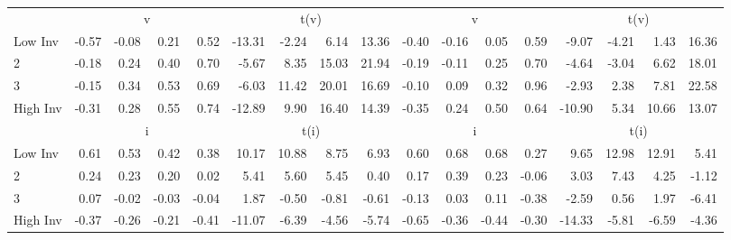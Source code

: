 \begin{table}[!ht]
\begin{tabular}{lrrrrrrrrrrrrrrrr}
     & \multicolumn{4}{c}{v} & \multicolumn{4}{c}{t(v)}  & \multicolumn{4}{c}{v} & \multicolumn{4}{c}{t(v)}   \\
     \cmidrule(r){2-5} \cmidrule(r){6-9}  \cmidrule(r){10-13} \cmidrule(r){14-17} 
    Low Inv  & -0.57  & -0.08  & 0.21  & 0.52  & -13.31  & -2.24  & 6.14  & 13.36  & -0.40  & -0.16  & 0.05  & 0.59  & -9.07  & -4.21  & 1.43  & 16.36   \\
    2  & -0.18  & 0.24  & 0.40  & 0.70  & -5.67  & 8.35  & 15.03  & 21.94  & -0.19  & -0.11  & 0.25  & 0.70  & -4.64  & -3.04  & 6.62  & 18.01   \\
    3  & -0.15  & 0.34  & 0.53  & 0.69  & -6.03  & 11.42  & 20.01  & 16.69  & -0.10  & 0.09  & 0.32  & 0.96  & -2.93  & 2.38  & 7.81  & 22.58   \\
    High Inv  & -0.31  & 0.28  & 0.55  & 0.74  & -12.89  & 9.90  & 16.40  & 14.39  & -0.35  & 0.24  & 0.50  & 0.64  & -10.90  & 5.34  & 10.66  & 13.07   \\


     & \multicolumn{4}{c}{i} & \multicolumn{4}{c}{t(i)}  & \multicolumn{4}{c}{i} & \multicolumn{4}{c}{t(i)}   \\
     \cmidrule(r){2-5} \cmidrule(r){6-9}  \cmidrule(r){10-13} \cmidrule(r){14-17} 
    Low Inv  & 0.61  & 0.53  & 0.42  & 0.38  & 10.17  & 10.88  & 8.75  & 6.93  & 0.60  & 0.68  & 0.68  & 0.27  & 9.65  & 12.98  & 12.91  & 5.41   \\
    2  & 0.24  & 0.23  & 0.20  & 0.02  & 5.41  & 5.60  & 5.45  & 0.40  & 0.17  & 0.39  & 0.23  & -0.06  & 3.03  & 7.43  & 4.25  & -1.12   \\
    3  & 0.07  & -0.02  & -0.03  & -0.04  & 1.87  & -0.50  & -0.81  & -0.61  & -0.13  & 0.03  & 0.11  & -0.38  & -2.59  & 0.56  & 1.97  & -6.41   \\
    High Inv  & -0.37  & -0.26  & -0.21  & -0.41  & -11.07  & -6.39  & -4.56  & -5.74  & -0.65  & -0.36  & -0.44  & -0.30  & -14.33  & -5.81  & -6.59  & -4.36   \\



  \bottomrule
\end{tabular}
\label{tbl:32_Size_BM_Inv_B16}
\end{table}